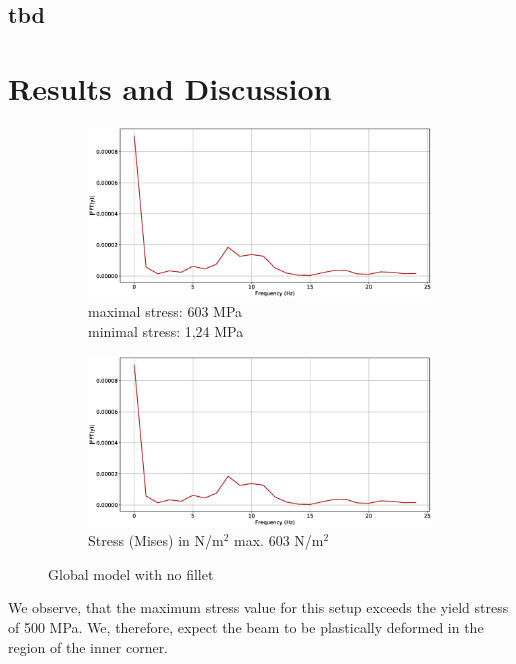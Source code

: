 \documentclass[12pt]{article}
\begin{document}
\subsection{tbd}


\pagebreak
\section{Results and Discussion}
\begin{figure}[!htb]
  \centering
  \begin{subfigure}{.5\textwidth}
    \centering
    \includegraphics[width=0.95\linewidth]{pics/vib_fourier}
    \caption{maximal stress: 603 MPa \\\hspace{\textwidth}minimal stress: 1,24 MPa}
  \end{subfigure}%
  \begin{subfigure}{.5\textwidth}
    \centering
    \includegraphics[width=0.95\linewidth]{pics/vib_fourier}
    \caption{Stress (Mises) in N/m$^{2}$ max. 603 N/m$^{2}$}
   \end{subfigure}
  \caption{Global model with no fillet}
\end{figure}

We observe, that the maximum stress value for this setup exceeds the yield stress of 500 MPa. 
We, therefore, expect the beam to be plastically deformed in the region of the inner corner.
\end{document}
